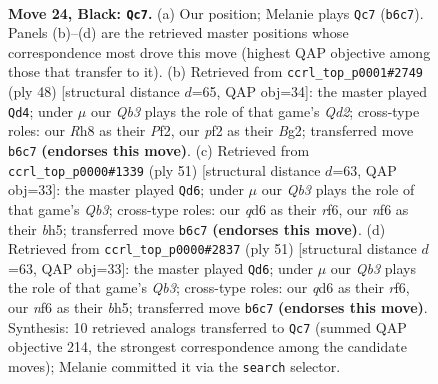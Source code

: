 \documentclass[11pt]{article}
\begin{document}
\clearpage

\begin{figure}[p]\centering
\begin{subfigure}{0.46\textwidth}\centering
\resizebox{\linewidth}{!}{%
\newchessgame
\chessboard[
  setfen={rk5r/p4p1p/1qpQ1N2/8/3p4/3P4/b4PPP/2R3K1 b - - 7 24},
  showmover=false,
  pgfstyle=straightmove, color=movearrow, markmove={b6-c7}
]}
\caption{}
\end{subfigure}\hfill
\begin{subfigure}{0.46\textwidth}\centering
\resizebox{\linewidth}{!}{%
\newchessgame
\chessboard[
  setfen={4r2k/pb3pp1/1p1q3p/3P4/8/6P1/P2Q1PBP/3R2K1 w - - 2 25},
  showmover=false,
  pgfstyle=straightmove, color=movearrow, markmove={d2-d4}
]}
\caption{}
\end{subfigure}
\\[4pt]
\begin{subfigure}{0.46\textwidth}\centering
\resizebox{\linewidth}{!}{%
\newchessgame
\chessboard[
  setfen={2bk4/3r3p/pq2pR2/2p1p2B/8/4Q3/P1P3PP/6K1 b - - 0 26},
  showmover=false,
  pgfstyle=straightmove, color=movearrow, markmove={b6-d6}
]}
\caption{}
\end{subfigure}\hfill
\begin{subfigure}{0.46\textwidth}\centering
\resizebox{\linewidth}{!}{%
\newchessgame
\chessboard[
  setfen={2bk4/3r3p/pq2pR2/2p1p2B/8/4Q3/P1P3PP/6K1 b - - 0 26},
  showmover=false,
  pgfstyle=straightmove, color=movearrow, markmove={b6-d6}
]}
\caption{}
\end{subfigure}
\caption{\textbf{Move 24, Black: \texttt{Qc7}.} (a) Our position; Melanie plays \texttt{Qc7} (\texttt{b6c7}). Panels (b)--(d) are the retrieved master positions whose correspondence most drove this move (highest QAP objective among those that transfer to it). (b) Retrieved from \texttt{ccrl\_top\_p0001\#2749} (ply 48) [structural distance $d$=65, QAP obj=34]: the master played \texttt{Qd4}; under $\mu$ our \emph{Qb3} plays the role of that game's \emph{Qd2}; cross-type roles: our \emph{R}h8 as their \emph{P}f2, our \emph{p}f2 as their \emph{B}g2; transferred move \texttt{b6c7} \textbf{(endorses this move)}. (c) Retrieved from \texttt{ccrl\_top\_p0000\#1339} (ply 51) [structural distance $d$=63, QAP obj=33]: the master played \texttt{Qd6}; under $\mu$ our \emph{Qb3} plays the role of that game's \emph{Qb3}; cross-type roles: our \emph{q}d6 as their \emph{r}f6, our \emph{n}f6 as their \emph{b}h5; transferred move \texttt{b6c7} \textbf{(endorses this move)}. (d) Retrieved from \texttt{ccrl\_top\_p0000\#2837} (ply 51) [structural distance $d$=63, QAP obj=33]: the master played \texttt{Qd6}; under $\mu$ our \emph{Qb3} plays the role of that game's \emph{Qb3}; cross-type roles: our \emph{q}d6 as their \emph{r}f6, our \emph{n}f6 as their \emph{b}h5; transferred move \texttt{b6c7} \textbf{(endorses this move)}. Synthesis: 10 retrieved analogs transferred to \texttt{Qc7} (summed QAP objective 214, the strongest correspondence among the candidate moves); Melanie committed it via the \texttt{search} selector.}
\label{fig:thought-m47}
\end{figure}
\end{document}
